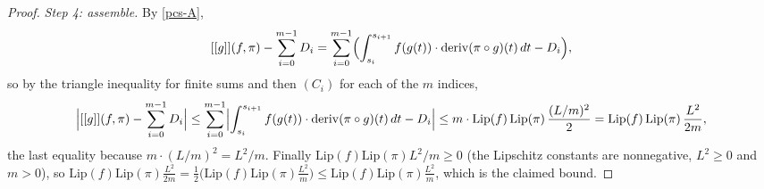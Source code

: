 \begin{proof}
  \emph{Step 4: assemble.} By \eqref{pcs-A},
  \[
    [[g]](f,\pi) - \sum_{i=0}^{m-1} D_i
      = \sum_{i=0}^{m-1}\Bigl( \int_{s_i}^{s_{i+1}} f(g(t)) \cdot
        \mathrm{deriv}(\pi \circ g)(t)\,dt - D_i \Bigr)
    ,
  \]
  so by the triangle inequality for finite sums and then $(C_i)$ for each of the $m$ indices,
  \[
    \Bigl| [[g]](f,\pi) - \sum_{i=0}^{m-1} D_i \Bigr|
      \le \sum_{i=0}^{m-1} \Bigl| \int_{s_i}^{s_{i+1}} f(g(t)) \cdot
        \mathrm{deriv}(\pi \circ g)(t)\,dt - D_i \Bigr|
      \le m \cdot \mathrm{Lip}(f)\,\mathrm{Lip}(\pi)\,\frac{(L/m)^2}{2}
      = \mathrm{Lip}(f)\,\mathrm{Lip}(\pi)\,\frac{L^2}{2m}
    ,
  \]
  the last equality because $m \cdot (L/m)^2 = L^2/m$. Finally
  $\mathrm{Lip}(f)\mathrm{Lip}(\pi)L^2/m \ge 0$ (the Lipschitz constants are nonnegative,
  $L^2 \ge 0$ and $m > 0$), so
  $\mathrm{Lip}(f)\mathrm{Lip}(\pi)\frac{L^2}{2m}
    = \frac{1}{2}\bigl(\mathrm{Lip}(f)\mathrm{Lip}(\pi)\frac{L^2}{m}\bigr)
    \le \mathrm{Lip}(f)\mathrm{Lip}(\pi)\frac{L^2}{m}$, which is the claimed bound.
\end{proof}

